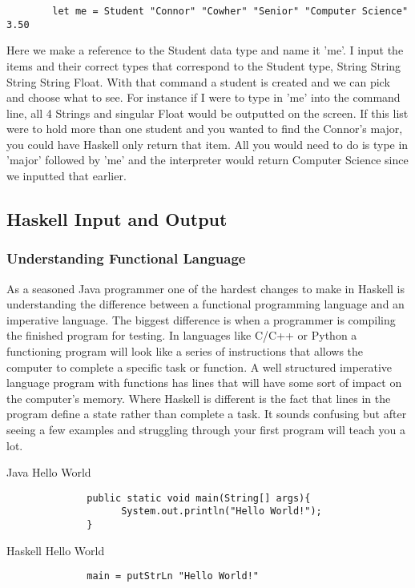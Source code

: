 \documentclass{article}
\begin{document}
    \begin{lstlisting}
        let me = Student "Connor" "Cowher" "Senior" "Computer Science" 3.50
    \end{lstlisting}
    \noindent Here we make a reference to the Student data type and name it 'me'. I input the items and their correct types that correspond to the Student type, String String String String Float. With that command a student is created and we can pick and choose what to see. For instance if I were to type in 'me' into the command line, all 4 Strings and singular Float would be outputted on the screen. If this list were to hold more than one student and you wanted to find the Connor's major, you could have Haskell only return that item. All you would need to do is type in 'major' followed by 'me' and the interpreter would return Computer Science since we inputted that earlier. 
    
\subsection{Haskell Input and Output}
    \subsubsection{Understanding Functional Language}
    As a seasoned Java programmer one of the hardest changes to make in Haskell is understanding the difference between a functional programming language and an imperative language. The biggest difference is when a programmer is compiling the finished program for testing. In languages like C/C++ or Python a functioning program will look like a series of instructions that allows the computer to complete a specific task or function. A well structured imperative language program with functions has lines that will have some sort of impact on the computer's memory. Where Haskell is different is the fact that lines in the program define a state rather than complete a task. It sounds confusing but after seeing a few examples and struggling through your first program will teach you a lot. 
    
    \clearpage
    \caption{Java Hello World}
    \begin{lstlisting}
              public static void main(String[] args){
                    System.out.println("Hello World!");
              }
    \end{lstlisting}
    
    \medskip
    \caption{Haskell Hello World}
    \begin{lstlisting}
              main = putStrLn "Hello World!"
    \end{lstlisting}
    
\end{document}

